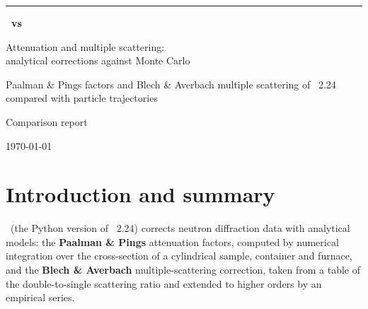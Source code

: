 \documentclass[11pt,a4paper]{report}
\begin{document}
\begin{titlepage}
\thispagestyle{empty}
\vspace*{2.5cm}
{\color{accent}\rule{\linewidth}{2pt}}\par\vspace{0.6cm}
{\fontsize{34}{40}\selectfont\bfseries\pyc\ \normalfont vs\ \bfseries\mcams}\par\vspace{0.4cm}
{\LARGE Attenuation and multiple scattering:\\[2pt] analytical corrections against Monte Carlo}\par\vspace{0.3cm}
{\Large\color{ink2} Paalman \& Pings factors and Blech \& Averbach multiple scattering
of \cor\ 2.24 compared with particle trajectories}\par
\vspace{0.6cm}{\color{accent}\rule{\linewidth}{2pt}}\par
\vspace{1.5cm}
{\Large Comparison report}\par
\vfill
{}
\vspace{1cm}
{\small\color{ink2}\today}
\end{titlepage}

\tableofcontents
\clearpage
{}

\chapter{Introduction and summary}

\pyc\ (the Python version of \cor\ 2.24) corrects neutron diffraction data with
analytical models: the \textbf{Paalman \& Pings} attenuation factors, computed by
numerical integration over the cross-section of a cylindrical sample, container
and furnace, and the \textbf{Blech \& Averbach} multiple-scattering correction,
taken from a table of the double-to-single scattering ratio and extended to
higher orders by an empirical series.
\end{document}
